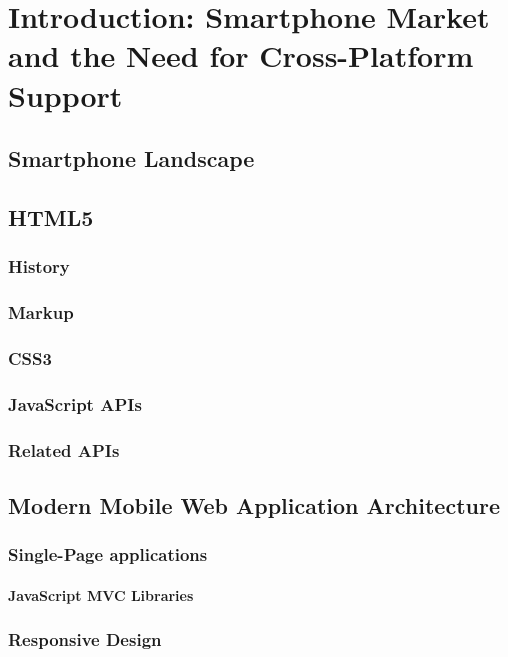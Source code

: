 \chapter{Introduction: Smartphone Market and the Need for Cross-Platform Support}
\label{chapter:introduction}

\section{Smartphone Landscape}
\label{section:smartphone-landscape}

\section{HTML5}
\label{section:html5}

\subsection{History}
\subsection{Markup}
\subsection{CSS3}
\subsection{JavaScript APIs}
\subsection{Related APIs}

\section{Modern Mobile Web Application Architecture}
\label{section:modern-mobile-web}

\subsection{Single-Page applications}
\subsubsection{JavaScript MVC Libraries}

\subsection{Responsive Design}
